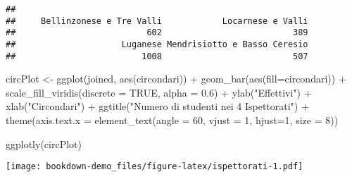 \documentclass[
]{book}
\newenvironment{Shaded}{\begin{snugshade}}{\end{snugshade}}
\newcommand{\AttributeTok}[1]{\textcolor[rgb]{0.77,0.63,0.00}{#1}}
\newcommand{\ConstantTok}[1]{\textcolor[rgb]{0.00,0.00,0.00}{#1}}
\newcommand{\DecValTok}[1]{\textcolor[rgb]{0.00,0.00,0.81}{#1}}
\newcommand{\FloatTok}[1]{\textcolor[rgb]{0.00,0.00,0.81}{#1}}
\newcommand{\FunctionTok}[1]{\textcolor[rgb]{0.00,0.00,0.00}{#1}}
\newcommand{\NormalTok}[1]{#1}
\newcommand{\OtherTok}[1]{\textcolor[rgb]{0.56,0.35,0.01}{#1}}
\newcommand{\SpecialCharTok}[1]{\textcolor[rgb]{0.00,0.00,0.00}{#1}}
\newcommand{\StringTok}[1]{\textcolor[rgb]{0.31,0.60,0.02}{#1}}
\begin{document}
\begin{Shaded}
\end{Shaded}

\begin{verbatim}
## 
##     Bellinzonese e Tre Valli            Locarnese e Valli 
##                          602                          389 
##                     Luganese Mendrisiotto e Basso Ceresio 
##                         1008                          507
\end{verbatim}

\begin{Shaded}
\begin{Highlighting}[]
\NormalTok{circPlot }\OtherTok{\textless{}{-}} \FunctionTok{ggplot}\NormalTok{(joined, }\FunctionTok{aes}\NormalTok{(circondari)) }\SpecialCharTok{+}
  \FunctionTok{geom\_bar}\NormalTok{(}\FunctionTok{aes}\NormalTok{(}\AttributeTok{fill=}\NormalTok{circondari)) }\SpecialCharTok{+}
  \FunctionTok{scale\_fill\_viridis}\NormalTok{(}\AttributeTok{discrete =} \ConstantTok{TRUE}\NormalTok{, }\AttributeTok{alpha =} \FloatTok{0.6}\NormalTok{) }\SpecialCharTok{+}
  \FunctionTok{ylab}\NormalTok{(}\StringTok{"Effettivi"}\NormalTok{) }\SpecialCharTok{+}
  \FunctionTok{xlab}\NormalTok{(}\StringTok{"Circondari"}\NormalTok{) }\SpecialCharTok{+}
  \FunctionTok{ggtitle}\NormalTok{(}\StringTok{"Numero di studenti nei 4 Ispettorati"}\NormalTok{) }\SpecialCharTok{+}
  \FunctionTok{theme}\NormalTok{(}\AttributeTok{axis.text.x =} \FunctionTok{element\_text}\NormalTok{(}\AttributeTok{angle =} \DecValTok{60}\NormalTok{, }\AttributeTok{vjust =} \DecValTok{1}\NormalTok{, }\AttributeTok{hjust=}\DecValTok{1}\NormalTok{, }\AttributeTok{size =} \DecValTok{8}\NormalTok{)) }

\FunctionTok{ggplotly}\NormalTok{(circPlot)}
\end{Highlighting}
\end{Shaded}

\texttt{[image: bookdown-demo\_files/figure-latex/ispettorati-1.pdf]}
\end{document}
